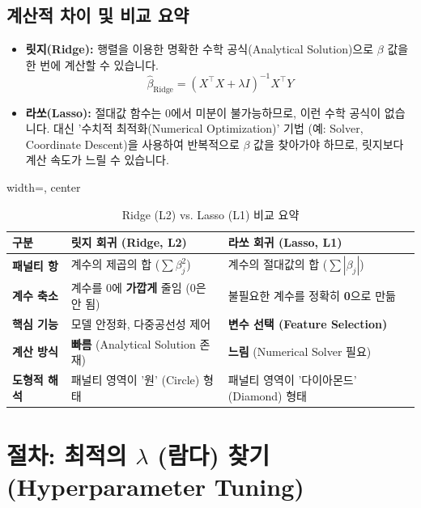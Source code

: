 \documentclass[11pt,a4paper]{book}
\theoremstyle{definition}
\begin{document}
\subsection{계산적 차이 및 비교 요약}

\begin{itemize}
    \item \textbf{릿지(Ridge):} 행렬을 이용한 명확한 수학 공식(Analytical Solution)으로 $\beta$ 값을 한 번에 계산할 수 있습니다.
    $$
    \hat{\beta}_{\text{Ridge}} = (X^{\top}X + \lambda I)^{-1} X^{\top}Y
    $$
    \item \textbf{라쏘(Lasso):} 절대값 함수는 $0$에서 미분이 불가능하므로, 이런 수학 공식이 없습니다. 대신 '수치적 최적화(Numerical Optimization)' 기법 (예: Solver, Coordinate Descent)을 사용하여 반복적으로 $\beta$ 값을 찾아가야 하므로, 릿지보다 계산 속도가 느릴 수 있습니다.
\end{itemize}

\begin{table}[h!]
\caption{Ridge (L2) vs. Lasso (L1) 비교 요약}
\label{tab:compare}
\begin{adjustbox}{width=\textwidth, center}
\begin{tabular}{@{}lll@{}}
\toprule
\textbf{구분} & \textbf{릿지 회귀 (Ridge, L2)} & \textbf{라쏘 회귀 (Lasso, L1)} \\
\midrule
\textbf{패널티 항} & 계수의 제곱의 합 ($\sum \beta_j^2$) & 계수의 절대값의 합 ($\sum |\beta_j|$) \\
\addlinespace
\textbf{계수 축소} & 계수를 0에 \textbf{가깝게} 줄임 (0은 안 됨) & 불필요한 계수를 정확히 \textbf{0}으로 만듦 \\
\addlinespace
\textbf{핵심 기능} & 모델 안정화, 다중공선성 제어 & \textbf{변수 선택 (Feature Selection)} \\
\addlinespace
\textbf{계산 방식} & \textbf{빠름} (Analytical Solution 존재) & \textbf{느림} (Numerical Solver 필요) \\
\addlinespace
\textbf{도형적 해석} & 패널티 영역이 '원' (Circle) 형태 & 패널티 영역이 '다이아몬드' (Diamond) 형태 \\
\bottomrule
\end{tabular}
\end{adjustbox}
\end{table}


\section{절차: 최적의 $\lambda$ (람다) 찾기 (Hyperparameter Tuning)}
\end{document}
